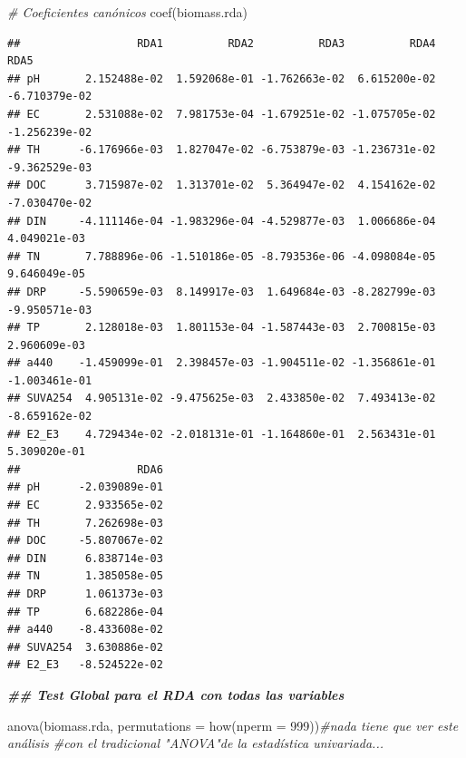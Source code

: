 \documentclass[
]{book}
\newenvironment{Shaded}{\begin{snugshade}}{\end{snugshade}}
\newcommand{\AttributeTok}[1]{\textcolor[rgb]{0.77,0.63,0.00}{#1}}
\newcommand{\CommentTok}[1]{\textcolor[rgb]{0.56,0.35,0.01}{\textit{#1}}}
\newcommand{\DecValTok}[1]{\textcolor[rgb]{0.00,0.00,0.81}{#1}}
\newcommand{\DocumentationTok}[1]{\textcolor[rgb]{0.56,0.35,0.01}{\textbf{\textit{#1}}}}
\newcommand{\FunctionTok}[1]{\textcolor[rgb]{0.00,0.00,0.00}{#1}}
\newcommand{\NormalTok}[1]{#1}
\begin{document}
\begin{Shaded}
\begin{Highlighting}[]
\CommentTok{\# Coeficientes canónicos }
\FunctionTok{coef}\NormalTok{(biomass.rda)}
\end{Highlighting}
\end{Shaded}

\begin{verbatim}
##                  RDA1          RDA2          RDA3          RDA4          RDA5
## pH       2.152488e-02  1.592068e-01 -1.762663e-02  6.615200e-02 -6.710379e-02
## EC       2.531088e-02  7.981753e-04 -1.679251e-02 -1.075705e-02 -1.256239e-02
## TH      -6.176966e-03  1.827047e-02 -6.753879e-03 -1.236731e-02 -9.362529e-03
## DOC      3.715987e-02  1.313701e-02  5.364947e-02  4.154162e-02 -7.030470e-02
## DIN     -4.111146e-04 -1.983296e-04 -4.529877e-03  1.006686e-04  4.049021e-03
## TN       7.788896e-06 -1.510186e-05 -8.793536e-06 -4.098084e-05  9.646049e-05
## DRP     -5.590659e-03  8.149917e-03  1.649684e-03 -8.282799e-03 -9.950571e-03
## TP       2.128018e-03  1.801153e-04 -1.587443e-03  2.700815e-03  2.960609e-03
## a440    -1.459099e-01  2.398457e-03 -1.904511e-02 -1.356861e-01 -1.003461e-01
## SUVA254  4.905131e-02 -9.475625e-03  2.433850e-02  7.493413e-02 -8.659162e-02
## E2_E3    4.729434e-02 -2.018131e-01 -1.164860e-01  2.563431e-01  5.309020e-01
##                  RDA6
## pH      -2.039089e-01
## EC       2.933565e-02
## TH       7.262698e-03
## DOC     -5.807067e-02
## DIN      6.838714e-03
## TN       1.385058e-05
## DRP      1.061373e-03
## TP       6.682286e-04
## a440    -8.433608e-02
## SUVA254  3.630886e-02
## E2_E3   -8.524522e-02
\end{verbatim}

\begin{Shaded}
\begin{Highlighting}[]
\DocumentationTok{\#\# Test Global para el RDA con todas las variables}
\end{Highlighting}
\end{Shaded}

\begin{Shaded}
\begin{Highlighting}[]
\FunctionTok{anova}\NormalTok{(biomass.rda, }\AttributeTok{permutations =} \FunctionTok{how}\NormalTok{(}\AttributeTok{nperm =} \DecValTok{999}\NormalTok{))}\CommentTok{\#nada tiene que ver este análisis \#con el tradicional "ANOVA"de la estadística univariada...}
\end{Highlighting}
\end{Shaded}
\end{document}
